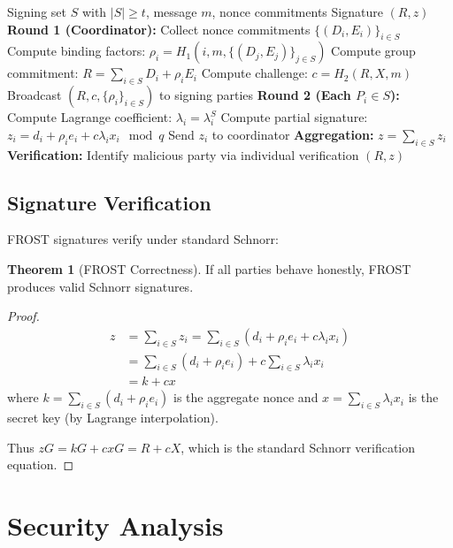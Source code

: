 \documentclass[11pt,a4paper]{article}
\theoremstyle{definition}
\newtheorem{theorem}{Theorem}
\begin{document}
\begin{algorithm}
\caption{FROST Threshold Signing}
\begin{algorithmic}[1]
\Require Signing set $S$ with $|S| \geq t$, message $m$, nonce commitments
\Ensure Signature $(R, z)$
\State \textbf{Round 1 (Coordinator):}
\State Collect nonce commitments $\{(D_i, E_i)\}_{i \in S}$
\State Compute binding factors: $\rho_i = H_1(i, m, \{(D_j, E_j)\}_{j \in S})$
\State Compute group commitment: $R = \sum_{i \in S} D_i + \rho_i E_i$
\State Compute challenge: $c = H_2(R, X, m)$
\State Broadcast $(R, c, \{\rho_i\}_{i \in S})$ to signing parties
\State \textbf{Round 2 (Each $P_i \in S$):}
\State Compute Lagrange coefficient: $\lambda_i = \lambda_i^S$
\State Compute partial signature:
\State $z_i = d_i + \rho_i e_i + c \lambda_i x_i \mod q$
\State Send $z_i$ to coordinator
\State \textbf{Aggregation:}
\State $z = \sum_{i \in S} z_i$
\State \textbf{Verification:}
    \State Identify malicious party via individual verification
\EndIf
\State \Return $(R, z)$
\end{algorithmic}
\end{algorithm}

\subsection{Signature Verification}

FROST signatures verify under standard Schnorr:

\begin{theorem}[FROST Correctness]
If all parties behave honestly, FROST produces valid Schnorr signatures.
\end{theorem}

\begin{proof}
\begin{align*}
z &= \sum_{i \in S} z_i = \sum_{i \in S} (d_i + \rho_i e_i + c \lambda_i x_i) \\
&= \sum_{i \in S} (d_i + \rho_i e_i) + c \sum_{i \in S} \lambda_i x_i \\
&= k + cx
\end{align*}
where $k = \sum_{i \in S}(d_i + \rho_i e_i)$ is the aggregate nonce and $x = \sum_{i \in S} \lambda_i x_i$ is the secret key (by Lagrange interpolation).

Thus $zG = kG + cxG = R + cX$, which is the standard Schnorr verification equation.
\end{proof}

\section{Security Analysis}
\end{document}
